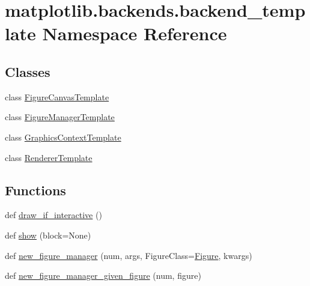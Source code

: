 \hypertarget{namespacematplotlib_1_1backends_1_1backend__template}{}\section{matplotlib.\+backends.\+backend\+\_\+template Namespace Reference}
\label{namespacematplotlib_1_1backends_1_1backend__template}
\subsection*{Classes}
\begin{DoxyCompactItemize}
\item 
class \hyperlink{classmatplotlib_1_1backends_1_1backend__template_1_1FigureCanvasTemplate}{Figure\+Canvas\+Template}
\item 
class \hyperlink{classmatplotlib_1_1backends_1_1backend__template_1_1FigureManagerTemplate}{Figure\+Manager\+Template}
\item 
class \hyperlink{classmatplotlib_1_1backends_1_1backend__template_1_1GraphicsContextTemplate}{Graphics\+Context\+Template}
\item 
class \hyperlink{classmatplotlib_1_1backends_1_1backend__template_1_1RendererTemplate}{Renderer\+Template}
\end{DoxyCompactItemize}
\subsection*{Functions}
\begin{DoxyCompactItemize}
\item 
def \hyperlink{namespacematplotlib_1_1backends_1_1backend__template_ab9f6122de25129df7d0774db8efa8f44}{draw\+\_\+if\+\_\+interactive} ()
\item 
def \hyperlink{namespacematplotlib_1_1backends_1_1backend__template_ae98264bf3966793c6428e1795fdac8d6}{show} (block=None)
\item 
def \hyperlink{namespacematplotlib_1_1backends_1_1backend__template_a508f73dd99bc0bc5be1c980aeae5bbe5}{new\+\_\+figure\+\_\+manager} (num, args, Figure\+Class=\hyperlink{classmatplotlib_1_1figure_1_1Figure}{Figure}, kwargs)
\item 
def \hyperlink{namespacematplotlib_1_1backends_1_1backend__template_aca13ba6fb1ff5437f6a162699af45f74}{new\+\_\+figure\+\_\+manager\+\_\+given\+\_\+figure} (num, figure)
\end{DoxyCompactItemize}
